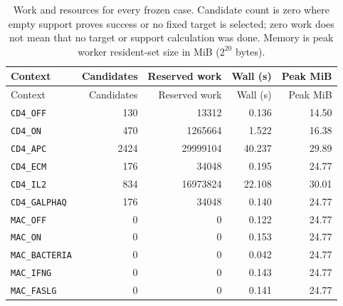 \begin{longtable}{@{}lrrrr@{}}
\caption{Work and resources for every frozen case. Candidate count is
zero where empty support proves success or no fixed target is selected;
zero work does not mean that no target or support calculation was done.
Memory is peak worker resident-set size in MiB ($2^{20}$ bytes).}
\label{tab:largeresources}\\
\toprule Context & Candidates & Reserved work & Wall (s) & Peak MiB\\\midrule\endfirsthead
\toprule Context & Candidates & Reserved work & Wall (s) & Peak MiB\\\midrule\endhead
\bottomrule\endfoot
\texttt{CD4\_OFF} & 130 & 13312 & 0.136 & 14.50\\
\texttt{CD4\_ON} & 470 & 1265664 & 1.522 & 16.38\\
\texttt{CD4\_APC} & 2424 & 29999104 & 40.237 & 29.89\\
\texttt{CD4\_ECM} & 176 & 34048 & 0.195 & 24.77\\
\texttt{CD4\_IL2} & 834 & 16973824 & 22.108 & 30.01\\
\texttt{CD4\_GALPHAQ} & 176 & 34048 & 0.140 & 24.77\\
\texttt{MAC\_OFF} & 0 & 0 & 0.122 & 24.77\\
\texttt{MAC\_ON} & 0 & 0 & 0.153 & 24.77\\
\texttt{MAC\_BACTERIA} & 0 & 0 & 0.042 & 24.77\\
\texttt{MAC\_IFNG} & 0 & 0 & 0.143 & 24.77\\
\texttt{MAC\_FASLG} & 0 & 0 & 0.141 & 24.77\\
\end{longtable}

